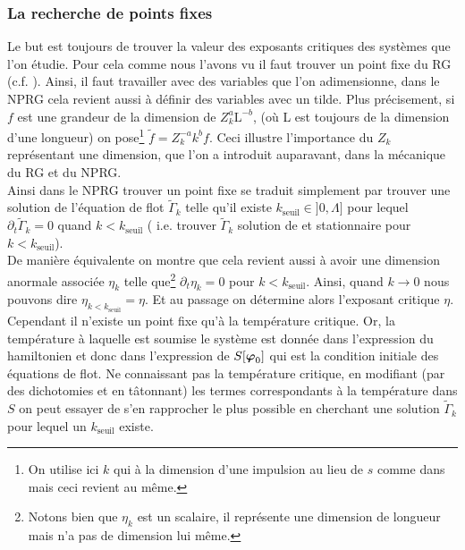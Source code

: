 \documentclass[10pt]{article}
\begin{document}
\begin{multicols}{2}
\vspace*{11pt}
\subsubsection{La recherche de points fixes}

Le but est toujours de trouver la valeur des exposants critiques des systèmes que l'on étudie. Pour cela comme nous l'avons vu il faut trouver un point fixe du RG (c.f. ). Ainsi, il faut travailler avec des variables que l'on adimensionne, dans le NPRG cela revient aussi à définir des variables avec un tilde. Plus précisement, si $f$ est une grandeur de la dimension de $Z_k^{a} \text{L}^{-b}$, (où L est toujours de la dimension d'une longueur) on pose\footnote{On utilise ici $k$ qui à la dimension d'une impulsion au lieu de $s$ comme dans  mais ceci revient au même.} $\tilde{f} = Z_k^{-a}k^{b}f$. Ceci illustre l'importance du $Z_k$ représentant une dimension, que l'on a introduit auparavant, dans la mécanique du RG et du NPRG.  \\

Ainsi dans le NPRG trouver un point fixe se traduit simplement par trouver une solution de l'équation de flot $\tilde{\Gamma}_k$ telle qu'il existe $k_\text{seuil} \in ]0, \Lambda]$ pour lequel $\partial_t \tilde{\Gamma}_k = 0$ quand $k<k_\text{seuil}$ ( i.e. trouver $\tilde{\Gamma}_k$ solution de  et stationnaire pour $k<k_\text{seuil}$).\\

De manière équivalente on montre que cela revient aussi à avoir une dimension anormale associée $\eta_k$ telle que\footnote{Notons bien que $\eta_k$ est un scalaire, il représente une dimension de longueur mais n'a pas de dimension lui même.} $\partial_t \eta_k = 0$ pour $k < k_\text{seuil}$. Ainsi, quand $k \to 0$ nous pouvons dire $\eta_{k<k_\text{seuil}} = \eta$. Et au passage on détermine alors l'exposant critique $\eta$. \\

Cependant il n'existe un point fixe qu'à la température critique. Or, la température à laquelle est soumise le système est donnée dans l'expression du hamiltonien et donc dans l'expression de $S[\boldsymbol{ \varphi}_0]$ qui est la condition initiale des équations de flot. Ne connaissant pas la température critique, en modifiant (par des dichotomies et en tâtonnant) les termes correspondants à la température dans $S$ on peut essayer de s'en rapprocher le plus possible en cherchant une solution $\tilde{\Gamma}_k$ pour lequel un $k_\text{seuil}$ existe.





\end{multicols}
\end{document}
